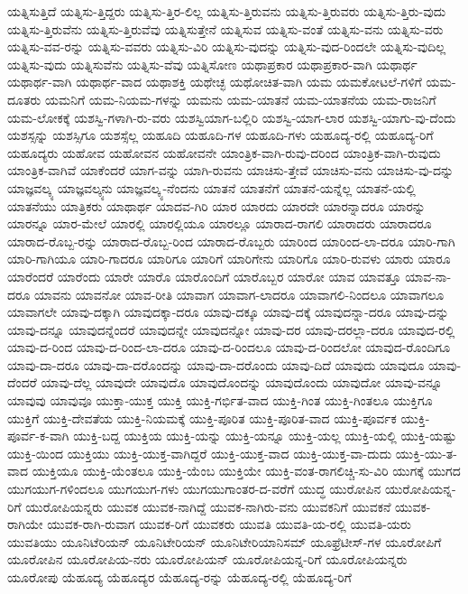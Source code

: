 {ಯತ್ನಿಸುತ್ತಿದೆ
ಯತ್ನಿಸು-ತ್ತಿದ್ದರು
ಯತ್ನಿಸು-ತ್ತಿರ-ಲಿಲ್ಲ
ಯತ್ನಿಸು-ತ್ತಿರುವನು
ಯತ್ನಿಸು-ತ್ತಿರುವರು
ಯತ್ನಿಸು-ತ್ತಿರು-ವುದು
ಯತ್ನಿಸು-ತ್ತಿರುವೆನು
ಯತ್ನಿಸು-ತ್ತಿರುವೆವು
ಯತ್ನಿಸುತ್ತೇನೆ
ಯತ್ನಿಸುವ
ಯತ್ನಿಸು-ವಂತೆ
ಯತ್ನಿಸು-ವನು
ಯತ್ನಿಸು-ವರು
ಯತ್ನಿಸು-ವವ-ರನ್ನು
ಯತ್ನಿಸು-ವವರು
ಯತ್ನಿಸು-ವಿರಿ
ಯತ್ನಿಸು-ವುದನ್ನು
ಯತ್ನಿಸು-ವುದ-ರಿಂದಲೇ
ಯತ್ನಿಸು-ವುದಿಲ್ಲ
ಯತ್ನಿಸು-ವುದು
ಯತ್ನಿಸುವೆನು
ಯತ್ನಿಸು-ವೆವು
ಯತ್ನಿಸೋಣ
ಯಥಾಪ್ರಕಾರ
ಯಥಾಪ್ರಕಾರ-ವಾಗಿ
ಯಥಾರ್ಥ
ಯಥಾರ್ಥ-ವಾಗಿ
ಯಥಾರ್ಥ-ವಾದ
ಯಥಾಶಕ್ತಿ
ಯಥೇಚ್ಛ
ಯಥೋಚಿತ-ವಾಗಿ
ಯಮ
ಯಮಕೋಟಲೆ-ಗಳಿಗೆ
ಯಮ-ದೂತರು
ಯಮನಿಗೆ
ಯಮ-ನಿಯಮ-ಗಳನ್ನು
ಯಮನು
ಯಮ-ಯಾತನೆ
ಯಮ-ಯಾತನೆಯ
ಯಮ-ರಾಜನಿಗೆ
ಯಮ-ಲೋಕಕ್ಕೆ
ಯಶಸ್ವಿ-ಗಳಾಗಿ-ರು-ವರು
ಯಶಸ್ವಿಯಾಗ-ಬಲ್ಲಿರಿ
ಯಶಸ್ವಿ-ಯಾಗ-ಲಾರ
ಯಶಸ್ವಿ-ಯಾಗು-ವು-ದೆಂದು
ಯಶಸ್ಸನ್ನು
ಯಶಸ್ಸಿಗೂ
ಯಶಸ್ಸೆಲ್ಲ
ಯಹೂದಿ
ಯಹೂದಿ-ಗಳ
ಯಹೂದಿ-ಗಳು
ಯಹೂದ್ಯ-ರಲ್ಲಿ
ಯಹೂದ್ಯ-ರಿಗೆ
ಯಹೂದ್ಯರು
ಯಹೋವ
ಯಹೋವನ
ಯಹೋವನೇ
ಯಾಂತ್ರಿಕ-ವಾಗಿ-ರುವು-ದರಿಂದ
ಯಾಂತ್ರಿಕ-ವಾಗಿ-ರುವುದು
ಯಾಂತ್ರಿಕ-ವಾಗಿವೆ
ಯಾಕೆಂದರೆ
ಯಾಗ-ವನ್ನು
ಯಾಗಿ-ರುವನು
ಯಾಚಿಸು-ತ್ತೇವೆ
ಯಾಚಿಸು-ವನು
ಯಾಚಿಸು-ವು-ದನ್ನು
ಯಾಜ್ಞವಲ್ಕ್ಯ
ಯಾಜ್ಞವಲ್ಕ್ಯನು
ಯಾಜ್ಞವಲ್ಕ್ಯ-ನೆಂದನು
ಯಾತನೆ
ಯಾತನೆಗೆ
ಯಾತನೆ-ಯನ್ನೆಲ್ಲ
ಯಾತನೆ-ಯಲ್ಲಿ
ಯಾತನೆಯು
ಯಾತ್ರಿಕರು
ಯಾಥಾರ್ಥ
ಯಾದವ-ಗಿರಿ
ಯಾರ
ಯಾರದು
ಯಾರದೇ
ಯಾರನ್ನಾದರೂ
ಯಾರನ್ನು
ಯಾರನ್ನೂ
ಯಾರ-ಮೇಲೆ
ಯಾರಲ್ಲಿ
ಯಾರಲ್ಲಿಯೂ
ಯಾರಲ್ಲೂ
ಯಾರಾದ-ರಾಗಲಿ
ಯಾರಾದರು
ಯಾರಾದರೂ
ಯಾರಾದ-ರೊಬ್ಬ-ರನ್ನು
ಯಾರಾದ-ರೊಬ್ಬ-ರಿಂದ
ಯಾರಾದ-ರೊಬ್ಬರು
ಯಾರಿಂದ
ಯಾರಿಂದ-ಲಾ-ದರೂ
ಯಾರಿ-ಗಾಗಿ
ಯಾರಿ-ಗಾಗಿಯೂ
ಯಾರಿ-ಗಾದರೂ
ಯಾರಿಗೂ
ಯಾರಿಗೆ
ಯಾರಿಗೇನು
ಯಾರಿಗೊ
ಯಾರಿ-ರುವಳು
ಯಾರು
ಯಾರೂ
ಯಾರೆಂದರೆ
ಯಾರೆಂದು
ಯಾರೇ
ಯಾರೊ
ಯಾರೊಂದಿಗೆ
ಯಾರೊಬ್ಬರ
ಯಾರೋ
ಯಾವ
ಯಾವತ್ತೂ
ಯಾವ-ನಾ-ದರೂ
ಯಾವನು
ಯಾವನೋ
ಯಾವ-ರೀತಿ
ಯಾವಾಗ
ಯಾವಾಗ-ಲಾದರೂ
ಯಾವಾಗಲಿ-ನಿಂದಲೂ
ಯಾವಾಗಲೂ
ಯಾವಾಗಲೇ
ಯಾವು-ದಕ್ಕಾಗಿ
ಯಾವುದಕ್ಕಾ-ದರೂ
ಯಾವು-ದಕ್ಕೂ
ಯಾವು-ದಕ್ಕೆ
ಯಾವುದನ್ನಾ-ದರೂ
ಯಾವು-ದನ್ನು
ಯಾವು-ದನ್ನೂ
ಯಾವುದನ್ನೆಂದರೆ
ಯಾವುದನ್ನೇ
ಯಾವುದನ್ನೋ
ಯಾವು-ದರ
ಯಾವು-ದರಲ್ಲಾ-ದರೂ
ಯಾವುದ-ರಲ್ಲಿ
ಯಾವು-ದ-ರಿಂದ
ಯಾವು-ದ-ರಿಂದ-ಲಾ-ದರೂ
ಯಾವು-ದ-ರಿಂದಲೂ
ಯಾವು-ದ-ರಿಂದಲೋ
ಯಾವುದ-ರೊಂದಿಗೂ
ಯಾವು-ದಾ-ದರೂ
ಯಾವು-ದಾ-ದರೊಂದನ್ನು
ಯಾವು-ದಾ-ದರೊಂದು
ಯಾವು-ದಿದೆ
ಯಾವುದು
ಯಾವುದೂ
ಯಾವು-ದೆಂದರೆ
ಯಾವು-ದೆಲ್ಲ
ಯಾವುದೇ
ಯಾವುದೊ
ಯಾವುದೊಂದನ್ನು
ಯಾವುದೊಂದು
ಯಾವುದೋ
ಯಾವು-ವನ್ನೂ
ಯಾವುವು
ಯಾವುವೂ
ಯುಕ್ತಾ-ಯುಕ್ತ
ಯುಕ್ತಿ
ಯುಕ್ತಿ-ಗರ್ಭಿತ-ವಾದ
ಯುಕ್ತಿ-ಗಿಂತ
ಯುಕ್ತಿ-ಗಿಂತಲೂ
ಯುಕ್ತಿಗೂ
ಯುಕ್ತಿಗೆ
ಯುಕ್ತಿ-ದೇವತೆಯ
ಯುಕ್ತಿ-ನಿಯಮಕ್ಕೆ
ಯುಕ್ತಿ-ಪೂರಿತ
ಯುಕ್ತಿ-ಪೂರಿತ-ವಾದ
ಯುಕ್ತಿ-ಪೂರ್ವಕ
ಯುಕ್ತಿ-ಪೂರ್ವ-ಕ-ವಾಗಿ
ಯುಕ್ತಿ-ಬದ್ದ
ಯುಕ್ತಿಯ
ಯುಕ್ತಿ-ಯನ್ನು
ಯುಕ್ತಿ-ಯನ್ನೂ
ಯುಕ್ತಿ-ಯಲ್ಲ
ಯುಕ್ತಿ-ಯಲ್ಲಿ
ಯುಕ್ತಿ-ಯಷ್ಟು
ಯುಕ್ತಿ-ಯಿಂದ
ಯುಕ್ತಿಯು
ಯುಕ್ತಿ-ಯುಕ್ತ-ವಾಗಿದ್ದರೆ
ಯುಕ್ತಿ-ಯುಕ್ತ-ವಾದ
ಯುಕ್ತಿ-ಯುಕ್ತ-ವಾ-ದುದು
ಯುಕ್ತಿ-ಯು-ತ-ವಾದ
ಯುಕ್ತಿಯೂ
ಯುಕ್ತಿ-ಯೆಂತಲೂ
ಯುಕ್ತಿ-ಯೆಂಬ
ಯುಕ್ತಿಯೇ
ಯುಕ್ತಿ-ವಂತ-ರಾಗಲಿಚ್ಚಿ-ಸು-ವಿರಿ
ಯುಗಕ್ಕೆ
ಯುಗದ
ಯುಗಯುಗ-ಗಳಿಂದಲೂ
ಯುಗಯುಗ-ಗಳು
ಯುಗಯುಗಾಂತರ-ದ-ವರೆಗೆ
ಯುದ್ಧ
ಯುರೋಪಿನ
ಯುರೋಪಿಯನ್ನ-ರಿಗೆ
ಯುರೋಪಿಯನ್ನರು
ಯುವಕ
ಯುವಕ-ನಾಗಿದ್ದೆ
ಯುವಕ-ನಾಗಿರು-ವನು
ಯುವಕನಿಗೆ
ಯುವಕನೆ
ಯುವಕ-ರಾಗಿಯೇ
ಯುವಕ-ರಾಗಿ-ರುವಾಗ
ಯುವಕ-ರಿಗೆ
ಯುವಕರು
ಯುವತಿ
ಯುವತಿ-ಯ-ರಲ್ಲಿ
ಯುವತಿ-ಯರು
ಯುವತಿಯು
ಯೂನಿಟೆರಿಯನ್
ಯೂನಿಟೇರಿಯನ್
ಯೂನಿಟೇರಿಯಾನಿಸಮ್
ಯೂಫ್ರೆಟೀಸ್-ಗಳ
ಯೂರೋಪಿಗೆ
ಯೂರೋಪಿನ
ಯೂರೋಪಿಯ-ನರು
ಯೂರೋಪಿಯನ್
ಯೂರೋಪಿಯನ್ನ-ರಿಗೆ
ಯೂರೋಪಿಯನ್ನರು
ಯೂರೋಪು
ಯೆಹೂದ್ಯ
ಯೆಹೂದ್ಯರ
ಯೆಹೂದ್ಯ-ರನ್ನು
ಯೆಹೂದ್ಯ-ರಲ್ಲಿ
ಯೆಹೂದ್ಯ-ರಿಗೆ
}
